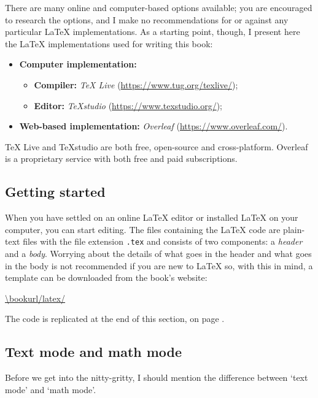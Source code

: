 There are many online and computer-based options available; you are encouraged to research the options, and I make no recommendations for or against any particular \LaTeX{} implementations. As a starting point, though, I present here the \LaTeX{} implementations used for writing this book:

\begin{itemize}
\item \textbf{Computer implementation:}
\begin{itemize}
\item \textbf{Compiler:} \textit{TeX Live} (\url{https://www.tug.org/texlive/});
\item \textbf{Editor:} \textit{TeXstudio} (\url{https://www.texstudio.org/});
\end{itemize}
\item \textbf{Web-based implementation:} \textit{Overleaf} (\url{https://www.overleaf.com/}).
\end{itemize}

TeX Live and TeXstudio are both free, open-source and cross-platform. Overleaf is a proprietary service with both free and paid subscriptions.


\subsection*{Getting started}

When you have settled on an online \LaTeX{} editor or installed \LaTeX{} on your computer, you can start editing. The files containing the \LaTeX{} code are plain-text files with the file extension \texttt{.tex} and consists of two components: a \textit{header} and a \textit{body}. Worrying about the details of what goes in the header and what goes in the body is not recommended if you are new to \LaTeX{} so, with this in mind, a template can be downloaded from the book's website:

\vspace{-15pt}
\begin{center}
\url{\bookurl/latex/}
\end{center}

\vspace{-10pt}
The code is replicated at the end of this section, on page \pageref{pTeXTemplate}.

\newpage
\subsection*{Text mode and math mode}
Before we get into the nitty-gritty, I should mention the difference between `text mode' and `math mode'.

